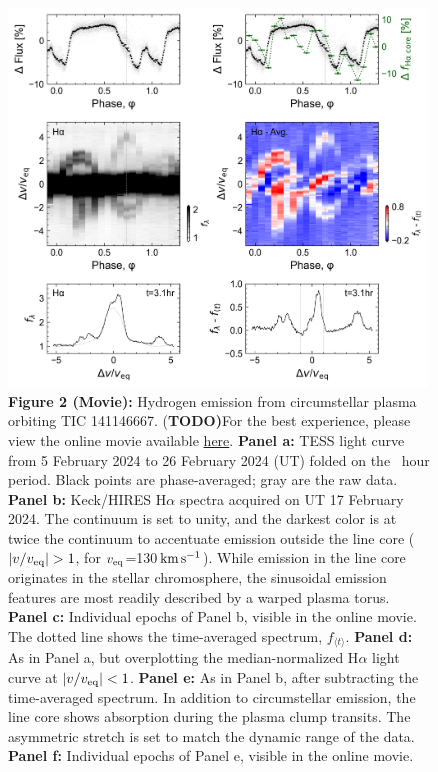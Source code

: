 \documentclass{nature3}
\newcommand{\kms}{\ensuremath{\rm km\,s^{-1}}}
\begin{document}
\begin{figure}[!tp]
  \centering
  \includegraphics[width=0.99\textwidth]{figures/f2.png}
  \captionsetup{labelformat=empty}
  \caption{{\bf Figure 2 (Movie):}  
  Hydrogen emission from circumstellar plasma orbiting TIC 141146667.
  {(\bf TODO)}For the best experience, please view the online movie
  available
  \href{https://lgbouma.com/movies/TIC141146667_sixpanel.mp4}{here}.
  {\bf Panel a:} TESS light curve from 5 February 2024 to 26 February
  2024 (UT) folded on the \periodhr\ hour period.  Black points are
  phase-averaged; gray are the raw data.
  {\bf Panel b:} Keck/HIRES H$\alpha$ spectra
  acquired on UT 17 February 2024.  The continuum is set to unity, and the
  darkest color is at twice the continuum to accentuate emission
  outside the line core ($|v/v_{\rm eq}|>1$, for $v_{\rm eq}$=130\,\kms).
  While emission in the line core originates in the stellar
  chromosphere, the sinusoidal emission features are most readily
  described by a warped plasma torus.
  {\bf Panel c:} Individual epochs of Panel b, visible in the
  online movie.  The dotted line shows the time-averaged spectrum,
  $f_{\langle t \rangle}$.
  {\bf Panel d:} As in Panel a, but overplotting the
  median-normalized H$\alpha$ light curve at $|v/v_{\rm eq}|<1$.
  {\bf Panel e:} As in Panel b, after subtracting the time-averaged
  spectrum. In addition to circumstellar emission, the line core shows
  absorption during the plasma clump transits.  The asymmetric stretch
  is set to match the dynamic range of the data.
  {\bf Panel f:} Individual epochs of Panel e, visible in the online
  movie.}
  \label{fig:spec}
\end{figure}
\end{document}
